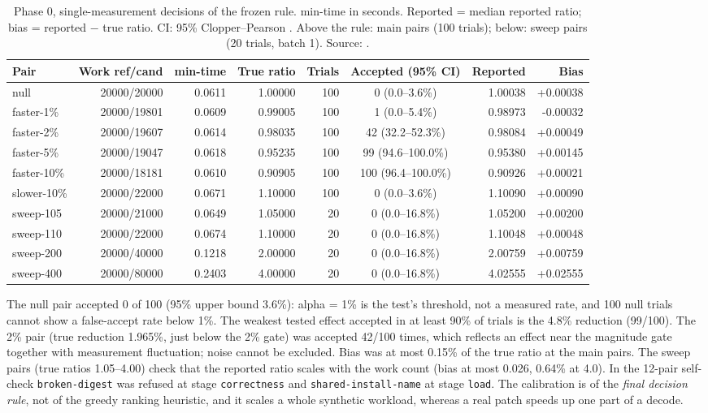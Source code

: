 \documentclass[10pt,a4paper]{article}
\begin{document}
\begin{table}[t]
\centering
\small
\setlength{\tabcolsep}{3.5pt}
\begin{tabular}{lrrrrcrr}
\toprule
Pair & Work ref/cand & min-time & True ratio & Trials & Accepted (95\% CI) & Reported & Bias \\
\midrule
null & 20000/20000 & 0.0611 & 1.00000 & 100 & 0 (0.0--3.6\%) & 1.00038 & +0.00038 \\
faster-1\% & 20000/19801 & 0.0609 & 0.99005 & 100 & 1 (0.0--5.4\%) & 0.98973 & -0.00032 \\
faster-2\% & 20000/19607 & 0.0614 & 0.98035 & 100 & 42 (32.2--52.3\%) & 0.98084 & +0.00049 \\
faster-5\% & 20000/19047 & 0.0618 & 0.95235 & 100 & 99 (94.6--100.0\%) & 0.95380 & +0.00145 \\
faster-10\% & 20000/18181 & 0.0610 & 0.90905 & 100 & 100 (96.4--100.0\%) & 0.90926 & +0.00021 \\
slower-10\% & 20000/22000 & 0.0671 & 1.10000 & 100 & 0 (0.0--3.6\%) & 1.10090 & +0.00090 \\
\midrule
sweep-105 & 20000/21000 & 0.0649 & 1.05000 & 20 & 0 (0.0--16.8\%) & 1.05200 & +0.00200 \\
sweep-110 & 20000/22000 & 0.0674 & 1.10000 & 20 & 0 (0.0--16.8\%) & 1.10048 & +0.00048 \\
sweep-200 & 20000/40000 & 0.1218 & 2.00000 & 20 & 0 (0.0--16.8\%) & 2.00759 & +0.00759 \\
sweep-400 & 20000/80000 & 0.2403 & 4.00000 & 20 & 0 (0.0--16.8\%) & 4.02555 & +0.02555 \\
\bottomrule
\end{tabular}
\caption{Phase 0, single-measurement decisions of the frozen rule. min-time in seconds. Reported = median reported ratio; bias = reported $-$ true ratio. CI: 95\% Clopper--Pearson \cite{clopper1934}. Above the rule: main pairs (100 trials); below: sweep pairs (20 trials, batch 1). Source: .}
\label{tab:calib}
\end{table}
The null pair accepted 0 of 100 (95\% upper bound 3.6\%): alpha = 1\% is the test's threshold, not a measured rate, and 100 null trials cannot show a false-accept rate below 1\%. The weakest tested effect accepted in at least 90\% of trials is the 4.8\% reduction (99/100). The 2\% pair (true reduction 1.965\%, just below the 2\% gate) was accepted 42/100 times, which reflects an effect near the magnitude gate together with measurement fluctuation; noise cannot be excluded. Bias was at most 0.15\% of the true ratio at the main pairs. The sweep pairs (true ratios 1.05--4.00) check that the reported ratio scales with the work count (bias at most 0.026, 0.64\% at 4.0). In the 12-pair self-check \texttt{broken-digest} was refused at stage \texttt{correctness} and \texttt{shared-install-name} at stage \texttt{load}. The calibration is of the \emph{final decision rule}, not of the greedy ranking heuristic, and it scales a whole synthetic workload, whereas a real patch speeds up one part of a decode.
\end{document}
